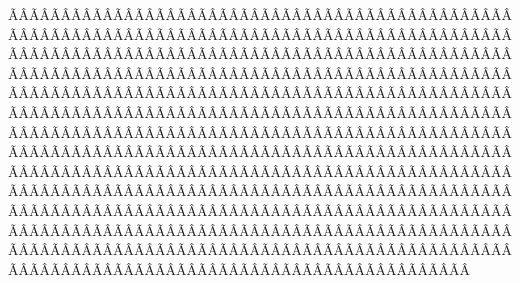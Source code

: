ÃÂÃÂÃÂÃÂÃÂÃÂÃÂÃÂÃÂÃÂÃÂÃÂÃÂÃÂÃÂÃÂÃÂÃÂÃÂÃÂÃÂÃÂÃÂÃÂÃÂÃÂÃÂÃÂÃÂÃÂÃÂÃÂÃÂÃÂÃÂÃÂÃÂÃÂÃÂÃÂÃÂÃÂÃÂÃÂÃÂÃÂÃÂÃÂÃÂÃÂÃÂÃÂÃÂÃÂÃÂÃÂÃÂÃÂÃÂÃÂÃÂÃÂÃÂÃÂÃÂÃÂÃÂÃÂÃÂÃÂÃÂÃÂÃÂÃÂÃÂÃÂÃÂÃÂÃÂÃÂÃÂÃÂÃÂÃÂÃÂÃÂÃÂÃÂÃÂÃÂÃÂÃÂÃÂÃÂÃÂÃÂÃÂÃÂÃÂÃÂÃÂÃÂÃÂÃÂÃÂÃÂÃÂÃÂÃÂÃÂÃÂÃÂÃÂÃÂÃÂÃÂÃÂÃÂÃÂÃÂÃÂÃÂÃÂÃÂÃÂÃÂÃÂÃÂÃÂÃÂÃÂÃÂÃÂÃÂÃÂÃÂÃÂÃÂÃÂÃÂÃÂÃÂÃÂÃÂÃÂÃÂÃÂÃÂÃÂÃÂÃÂÃÂÃÂÃÂÃÂÃÂÃÂÃÂÃÂÃÂÃÂÃÂÃÂÃÂÃÂÃÂÃÂÃÂÃÂÃÂÃÂÃÂÃÂÃÂÃÂÃÂÃÂÃÂÃÂÃÂÃÂÃÂÃÂÃÂÃÂÃÂÃÂÃÂÃÂÃÂÃÂÃÂÃÂÃÂÃÂÃÂÃÂÃÂÃÂÃÂÃÂÃÂÃÂÃÂÃÂÃÂÃÂÃÂÃÂÃÂÃÂÃÂÃÂÃÂÃÂÃÂÃÂÃÂÃÂÃÂÃÂÃÂÃÂÃÂÃÂÃÂÃÂÃÂÃÂÃÂÃÂÃÂÃÂÃÂÃÂÃÂÃÂÃÂÃÂÃÂÃÂÃÂÃÂÃÂÃÂÃÂÃÂÃÂÃÂÃÂÃÂÃÂÃÂÃÂÃÂÃÂÃÂÃÂÃÂÃÂÃÂÃÂÃÂÃÂÃÂÃÂÃÂÃÂÃÂÃÂÃÂÃÂÃÂÃÂÃÂÃÂÃÂÃÂÃÂÃÂÃÂÃÂÃÂÃÂÃÂÃÂÃÂÃÂÃÂÃÂÃÂÃÂÃÂÃÂÃÂÃÂÃÂÃÂÃÂÃÂÃÂÃÂÃÂÃÂÃÂÃÂÃÂÃÂÃÂÃÂÃÂÃÂÃÂÃÂÃÂÃÂÃÂÃÂÃÂÃÂÃÂÃÂÃÂÃÂÃÂÃÂÃÂÃÂÃÂÃÂÃÂÃÂÃÂÃÂ
